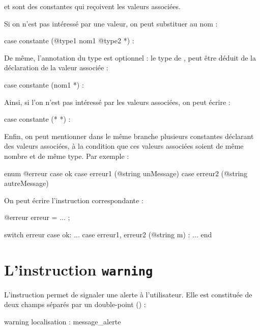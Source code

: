 {{ et  sont des constantes qui reçoivent les valeurs associées.

Si on n'est pas intéressé par une valeur, on peut substituer \galgas{*} au nom :

\begin{galgascode}
case constante (@type1 nom1 @type2 *) :
\end{galgascode}

De même, l'annotation du type est optionnel : le type de ,  peut être déduit de la déclaration de la valeur associée :

\begin{galgascode}
case constante (nom1 *) :
\end{galgascode}

Ainsi, si l'on n'est pas intéressé par les valeurs associées, on peut écrire :
\begin{galgascode}
case constante (* *) :
\end{galgascode}


Enfin, on peut mentionner dans le même branche  plusieurs constantes déclarant des valeurs associées, à la condition que ces valeurs associées soient de même nombre et de même type. Par exemple :

\begin{galgascode}
enum @erreur {
  case ok
  case erreur1 (@string unMessage)
  case erreur2 (@string autreMessage) 
}
\end{galgascode}

On peut écrire l'instruction  correspondante :
\begin{galgascode}
@erreur erreur = ... ;

switch erreur
case ok:
  ...
case erreur1, erreur2 (@string m) :
  ...
end
\end{galgascode}




\section{L'instruction \texttt{warning}}

L'instruction  permet de signaler une alerte à l'utilisateur. Elle est constituée de deux champs séparés par un double-point (\galgas{\:}) :

{
\begin{galgascode}
warning localisation : message_alerte
\end{galgascode}



}}}
